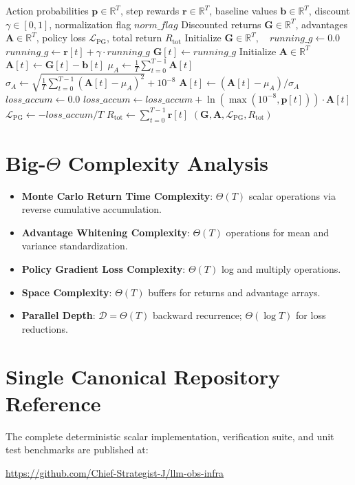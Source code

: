\documentclass[11pt,a4paper]{article}
\theoremstyle{definition}
\begin{document}
\begin{algorithm}[H]
\caption{REINFORCE with Baselines and Advantage Whitening}
\begin{algorithmic}[1]
\Require Action probabilities $\mathbf{p} \in \mathbb{R}^T$, step rewards $\mathbf{r} \in \mathbb{R}^T$, baseline values $\mathbf{b} \in \mathbb{R}^T$, discount $\gamma \in [0, 1]$, normalization flag $norm\_flag$
\Ensure Discounted returns $\mathbf{G} \in \mathbb{R}^T$, advantages $\mathbf{A} \in \mathbb{R}^T$, policy loss $\mathcal{L}_{\text{PG}}$, total return $R_{\text{tot}}$
\State Initialize $\mathbf{G} \in \mathbb{R}^T, \quad running\_g \gets 0.0$
 
    \State $running\_g \gets \mathbf{r}[t] + \gamma \cdot running\_g$
    \State $\mathbf{G}[t] \gets running\_g$
\EndFor
\State Initialize $\mathbf{A} \in \mathbb{R}^T$
 
    \State $\mathbf{A}[t] \gets \mathbf{G}[t] - \mathbf{b}[t]$
\EndFor
{} 
    \State $\mu_A \gets \frac{1}{T}\sum_{t=0}^{T-1} \mathbf{A}[t]$
    \State $\sigma_A \gets \sqrt{\frac{1}{T}\sum_{t=0}^{T-1} (\mathbf{A}[t] - \mu_A)^2} + 10^{-8}$
        \State $\mathbf{A}[t] \gets (\mathbf{A}[t] - \mu_A) / \sigma_A$
    \EndFor
\EndIf
\State $loss\_accum \gets 0.0$
 
    \State $loss\_accum \gets loss\_accum + \ln(\max(10^{-8}, \mathbf{p}[t])) \cdot \mathbf{A}[t]$
\EndFor
\State $\mathcal{L}_{\text{PG}} \gets - loss\_accum / T$
\State $R_{\text{tot}} \gets \sum_{t=0}^{T-1} \mathbf{r}[t]$
\State \Return $(\mathbf{G}, \mathbf{A}, \mathcal{L}_{\text{PG}}, R_{\text{tot}})$
\end{algorithmic}
\end{algorithm}

\section{Big-$\Theta$ Complexity Analysis}

\begin{itemize}
    \item \textbf{Monte Carlo Return Time Complexity}: $\Theta(T)$ scalar operations via reverse cumulative accumulation.
    \item \textbf{Advantage Whitening Complexity}: $\Theta(T)$ operations for mean and variance standardization.
    \item \textbf{Policy Gradient Loss Complexity}: $\Theta(T)$ log and multiply operations.
    \item \textbf{Space Complexity}: $\Theta(T)$ buffers for returns and advantage arrays.
    \item \textbf{Parallel Depth}: $\mathcal{D} = \Theta(T)$ backward recurrence; $\Theta(\log T)$ for loss reductions.
\end{itemize}

\section{Single Canonical Repository Reference}

The complete deterministic scalar implementation, verification suite, and unit test benchmarks are published at:
\begin{center}
\url{https://github.com/Chief-Strategist-J/llm-obs-infra}
\end{center}
\end{document}
